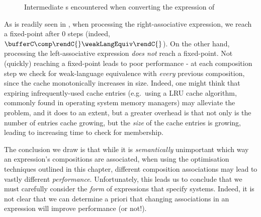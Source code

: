 
\begin{figure}[ht]
    \centering
\caption{Intermediate \TNFA{}s encountered when converting the expression of
}
\label{fig:rightassocBuffersIntermediate}
\end{figure}

As is readily seen in , when
processing the right-associative expression, we reach a fixed-point after $0$
steps (indeed, $\bufferC \comp \rendC{} \weakLangEquiv \rendC{}$). On the other
hand, processing the left-associative expression \emph{does not} reach a
fixed-point. Not (quickly) reaching a fixed-point leads to poor performance -
at each composition step we check for weak-language equivalence with
\emph{every} previous composition, since the cache monotonically increases in
size. Indeed, one might think that expiring infrequently-used cache entries
(e.g.\ using a LRU cache algorithm, commonly found in operating system memory
managers) may alleviate the problem, and it does to an extent, but a greater
overhead is that not only is the number of entries cache growing, but the
\emph{size} of the cache entries is growing, leading to increasing time to
check for membership.

The conclusion we draw is that while it is \emph{semantically} unimportant
which way an expression's compositions are associated, when using the
optimisation techniques outlined in this chapter, different composition
associations may lead to vastly different \emph{performance}. Unfortunately,
this leads us to conclude that we must carefully consider the \emph{form} of
expressions that specify systems. Indeed, it is not clear that we can determine
a priori that changing associations in an expression will improve performance
(or not!).

